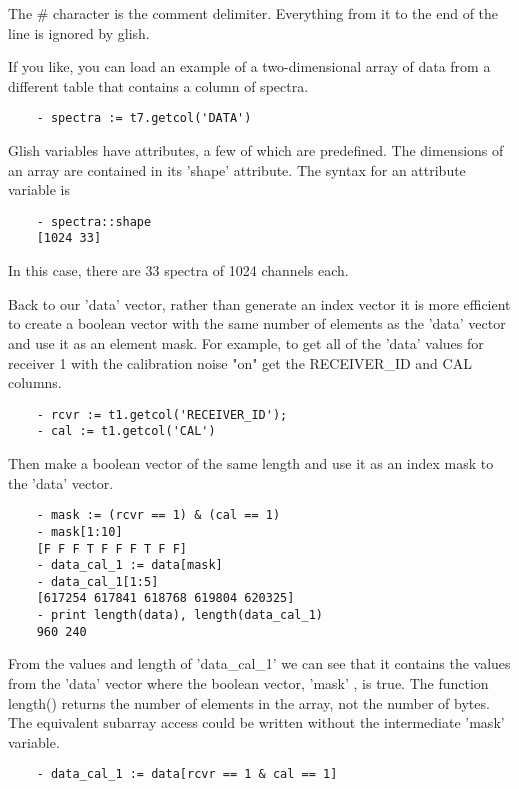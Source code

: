 The \# character is the comment delimiter.  Everything from it to the end of
the line is ignored by glish.

    If you like, you can load an example of a two-dimensional array of data
from a different table that contains a column of spectra.

\begin{verbatim}
	- spectra := t7.getcol('DATA')
\end{verbatim}

    Glish variables have attributes, a few of which are predefined.  The
dimensions of an array are contained in its 'shape' attribute.  The syntax
for an attribute variable is

\begin{verbatim}
	- spectra::shape
	[1024 33]
\end{verbatim}

In this case, there are 33 spectra of 1024 channels each.

    Back to our 'data' vector, rather than generate an index vector it is
more efficient to create a boolean vector with the same number of elements
as the 'data' vector and use it as an element mask.  For example, to get
all of the 'data' values for receiver 1 with the calibration noise "on" get
the RECEIVER\_ID and CAL columns.

\begin{verbatim}
	- rcvr := t1.getcol('RECEIVER_ID');
	- cal := t1.getcol('CAL')
\end{verbatim}

Then make a boolean vector of the same length and use it as an index mask
to the 'data' vector.

\begin{verbatim}
	- mask := (rcvr == 1) & (cal == 1)
	- mask[1:10]
	[F F F T F F F T F F]  
	- data_cal_1 := data[mask]
	- data_cal_1[1:5]
	[617254 617841 618768 619804 620325]
	- print length(data), length(data_cal_1)
	960 240
\end{verbatim}

From the values and length of 'data\_cal\_1' we can see that it contains the
values from the 'data' vector where the boolean vector, 'mask' , is true.
The function length() returns the number of elements in the array, not the
number of bytes.  The equivalent subarray access could be written without
the intermediate 'mask' variable.

\begin{verbatim}
	- data_cal_1 := data[rcvr == 1 & cal == 1]
\end{verbatim}

